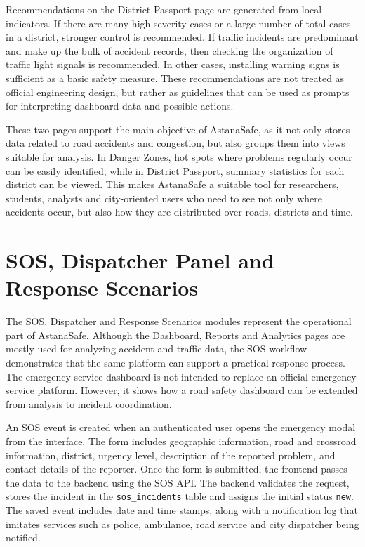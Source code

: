 ﻿\documentclass[12pt,a4paper]{report}
\begin{document}
Recommendations on the District Passport page are generated from local indicators. If there are many high-severity cases or a large number of total cases in a district, stronger control is recommended. If traffic incidents are predominant and make up the bulk of accident records, then checking the organization of traffic light signals is recommended. In other cases, installing warning signs is sufficient as a basic safety measure. These recommendations are not treated as official engineering design, but rather as guidelines that can be used as prompts for interpreting dashboard data and possible actions.

These two pages support the main objective of AstanaSafe, as it not only stores data related to road accidents and congestion, but also groups them into views suitable for analysis. In Danger Zones, hot spots where problems regularly occur can be easily identified, while in District Passport, summary statistics for each district can be viewed. This makes AstanaSafe a suitable tool for researchers, students, analysts and city-oriented users who need to see not only where accidents occur, but also how they are distributed over roads, districts and time.

\section{SOS, Dispatcher Panel and Response Scenarios}

The SOS, Dispatcher and Response Scenarios modules represent the operational part of AstanaSafe. Although the Dashboard, Reports and Analytics pages are mostly used for analyzing accident and traffic data, the SOS workflow demonstrates that the same platform can support a practical response process. The emergency service dashboard is not intended to replace an official emergency service platform. However, it shows how a road safety dashboard can be extended from analysis to incident coordination.

An SOS event is created when an authenticated user opens the emergency modal from the interface. The form includes geographic information, road and crossroad information, district, urgency level, description of the reported problem, and contact details of the reporter. Once the form is submitted, the frontend passes the data to the backend using the SOS API. The backend validates the request, stores the incident in the \texttt{sos\_incidents} table and assigns the initial status \texttt{new}. The saved event includes date and time stamps, along with a notification log that imitates services such as police, ambulance, road service and city dispatcher being notified.
\end{document}
